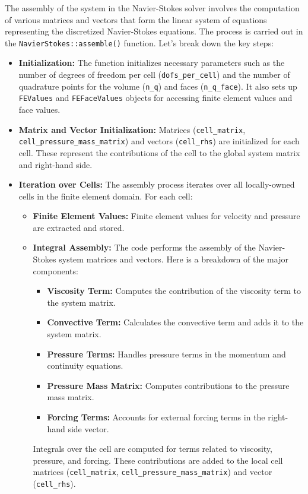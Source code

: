 \documentclass{article}
\begin{document}
The assembly of the system in the Navier-Stokes solver involves the computation of various matrices and vectors that form the linear system of equations representing the discretized Navier-Stokes equations. The process is carried out in the \texttt{NavierStokes::assemble()} function. Let's break down the key steps:

\begin{itemize}
    \item \textbf{Initialization:} The function initializes necessary parameters such as the number of degrees of freedom per cell (\texttt{dofs\_per\_cell}) and the number of quadrature points for the volume (\texttt{n\_q}) and faces (\texttt{n\_q\_face}). It also sets up \texttt{FEValues} and \texttt{FEFaceValues} objects for accessing finite element values and face values.

    \item \textbf{Matrix and Vector Initialization:} Matrices (\texttt{cell\_matrix}, \texttt{cell\_pressure\_mass\_matrix}) and vectors (\texttt{cell\_rhs}) are initialized for each cell. These represent the contributions of the cell to the global system matrix and right-hand side.

    \item \textbf{Iteration over Cells:} The assembly process iterates over all locally-owned cells in the finite element domain. For each cell:
        \begin{itemize}
            \item \textbf{Finite Element Values:} Finite element values for velocity and pressure are extracted and stored.
            
            \item \textbf{Integral Assembly:} The code performs the assembly of the Navier-Stokes system matrices and vectors. Here is a breakdown of the major components:

\begin{itemize}
  \item \textbf{Viscosity Term:} Computes the contribution of the viscosity term to the system matrix.
  \item \textbf{Convective Term:} Calculates the convective term and adds it to the system matrix.
  \item \textbf{Pressure Terms:} Handles pressure terms in the momentum and continuity equations.
  \item \textbf{Pressure Mass Matrix:} Computes contributions to the pressure mass matrix.
  \item \textbf{Forcing Terms:} Accounts for external forcing terms in the right-hand side vector.
\end{itemize}
            Integrals over the cell are computed for terms related to viscosity, pressure, and forcing. These contributions are added to the local cell matrices (\texttt{cell\_matrix}, \texttt{cell\_pressure\_mass\_matrix}) and vector (\texttt{cell\_rhs}).
            

\end{itemize}
\end{itemize}
\end{document}
